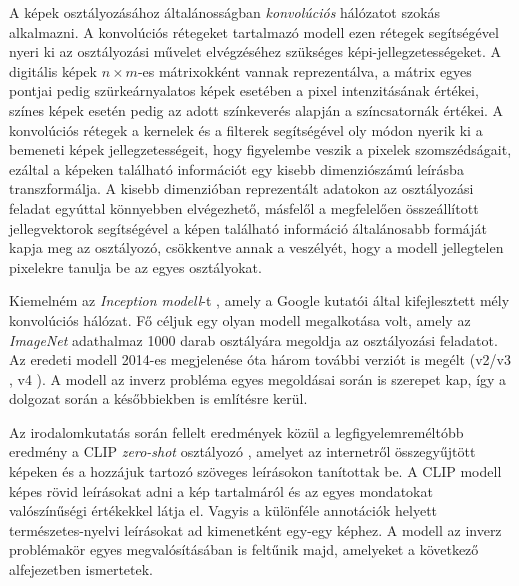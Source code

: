 A képek osztályozásához általánosságban \textit{konvolúciós} hálózatot szokás alkalmazni. A konvolúciós rétegeket tartalmazó modell ezen rétegek segítségével nyeri ki az osztályozási művelet elvégzéséhez szükséges képi-jellegzetességeket. A digitális képek $n \times m$-es mátrixokként vannak reprezentálva, a mátrix egyes pontjai pedig szürkeárnyalatos képek esetében a pixel intenzitásának értékei, színes képek esetén pedig az adott színkeverés alapján a színcsatornák értékei. A konvolúciós rétegek a kernelek és a filterek segítségével oly módon nyerik ki a bemeneti képek jellegzetességeit, hogy figyelembe veszik a pixelek szomszédságait, ezáltal a képeken található információt egy kisebb dimenziószámú leírásba transzformálja. A kisebb dimenzióban reprezentált adatokon az osztályozási feladat egyúttal könnyebben elvégezhető, másfelől a megfelelően összeállított jellegvektorok segítségével a képen található információ általánosabb formáját kapja meg az osztályozó, csökkentve annak a veszélyét, hogy a modell jellegtelen pixelekre tanulja be az egyes osztályokat.

Kiemelném az \textit{Inception modell}-t \cite{szegedy2015going}, amely a Google kutatói által kifejlesztett mély konvolúciós hálózat. Fő céljuk egy olyan modell megalkotása volt, amely az \textit{ImageNet} adathalmaz \cite{deng2009imagenet} 1000 darab osztályára megoldja az osztályozási feladatot. Az eredeti modell 2014-es megjelenése óta három további verziót is megélt (v2/v3 \cite{szegedy2016rethinking}, v4 \cite{szegedy2017inception}). A modell az inverz probléma egyes megoldásai során is szerepet kap, így a dolgozat során a későbbiekben is említésre kerül.

Az irodalomkutatás során fellelt eredmények közül a legfigyelemreméltóbb eredmény a CLIP \textit{zero-shot} osztályozó \cite{radford2021learning}, amelyet az internetről összegyűjtött képeken és a hozzájuk tartozó szöveges leírásokon tanítottak be. A CLIP modell képes rövid leírásokat adni a kép tartalmáról és az egyes mondatokat valószínűségi értékekkel látja el. Vagyis a különféle annotációk helyett természetes-nyelvi leírásokat ad kimenetként egy-egy képhez. A modell az inverz problémakör egyes megvalósításában is feltűnik majd, amelyeket a következő alfejezetben ismertetek.




